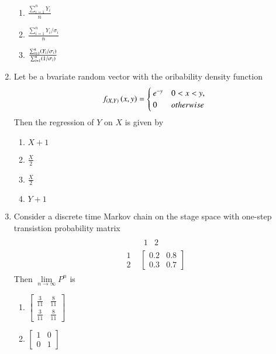 \documentclass[journal]{IEEEtran}
\begin{document}
\begin{enumerate}
\begin{enumerate}
			\item $\frac{\sum_{i=1}^{n}Y_i}{n}$
			\item $\frac{\sum_{i=1}^{n}Y_i/\sigma_i}{n}$
			\item $\frac{\sum_{i=1}^{n}\left(Y_i/\sigma_i\right)}{\sum_{i=1}^{n}\left(1/\sigma_i\right)}$
		\end{enumerate}
	\item Let  be a bvariate random vector with the oribability density function 
		\begin{align*}
			f_{\left(X, Y\right)}\left(x,y\right) = \begin{cases} 
				e^{-y}& 0 < x < y, \\
				0& otherwise
			\end{cases}
		\end{align*}
		Then the regression of $Y$ on $X$ is given by
		\begin{enumerate}
			\item $X+1$
			\item $\frac{X}{2}$
			\item $\frac{X}{2}$
			\item $Y+1$
		\end{enumerate}
	\item Consider a discrete time Markov chain on the stage space  with one-step transistion probability matrix 	
		\begin{align*}
			\begin{array}{cc}
				& \begin{array}{cc} 1 & 2 \end{array}\\
					\begin{array}{c}
						1 \\ 
						2 
					\end{array} &
					\begin{bmatrix}
						0.2 & 0.8 \\
						0.3 & 0.7
					\end{bmatrix}
			\end{array}
		\end{align*}
		Then $\lim\limits_{n\to\infty}P^n$ is
		\begin{enumerate}
			\item $\begin{bmatrix} \frac{3}{11} & \frac{8}{11} \\ \frac{3}{11} & \frac{8}{11} \end{bmatrix}$
				\item $\begin{bmatrix} 1 & 0 \\ 0 & 1 \end{bmatrix}$

\end{enumerate}
\end{enumerate}
\end{document}
